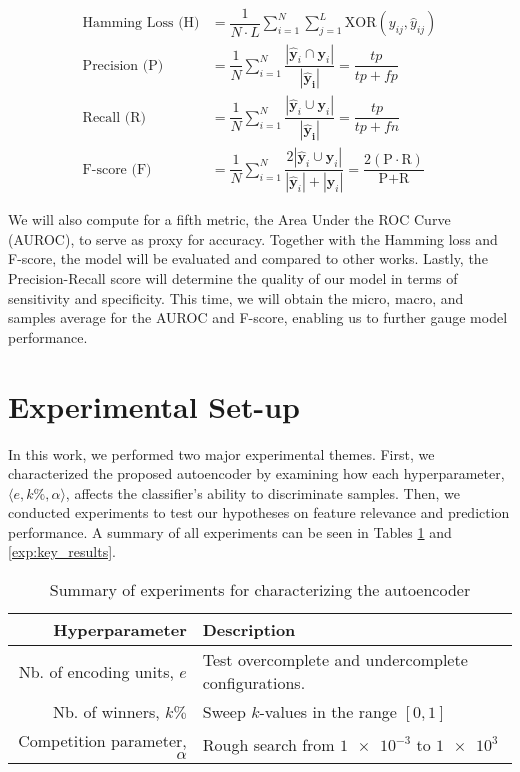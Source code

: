 \begin{align}
    \text{Hamming Loss (H)} &= \dfrac{1}{N \cdot L} \sum_{i=1}^{N} \sum_{j=1}^{L}
    \text{XOR}(y_{ij}, \widehat{y}_{ij}) \\
    \text{Precision (P)} &=
    \dfrac{1}{N}\sum_{i=1}^{N}\dfrac{|\mathbf{\widehat{y}}_{i} \cap
    \mathbf{y}_{i}|}{|\mathbf{\widehat{y}_{i}}|} = \dfrac{tp}{tp + fp} \\
    \text{Recall (R)} &=
    \dfrac{1}{N}\sum_{i=1}^{N}\dfrac{|\mathbf{\widehat{y}}_{i} \cup
    \mathbf{y}_{i}|}{|\mathbf{\widehat{y}_{i}}|} = \dfrac{tp}{tp + fn} \\
    \text{F-score (F)} &=
    \dfrac{1}{N}\sum_{i=1}^{N} \dfrac{2 | \mathbf{\widehat{y}}_{i} \cup
        \mathbf{y}_{i}|}{|\mathbf{\widehat{y}}_{i} | + |\mathbf{y}_{i}|} =
        \dfrac{2 (\text{P} \cdot \text{R})}{\text{P} +
        \text{R}}
\end{align}

\par We will also compute for a fifth metric, the Area Under the ROC Curve
(AUROC), to serve as proxy for accuracy. Together with the Hamming loss and
F-score, the model will be evaluated and compared to other works. Lastly, the
Precision-Recall score will determine the quality of our model in terms of
sensitivity and specificity. This time, we will obtain the micro, macro, and
samples average for the AUROC and F-score, enabling us to further gauge model
performance.

\section{Experimental Set-up}
\label{MCExperiments}

In this work, we performed two major experimental themes. First, we
characterized the proposed autoencoder by examining how each hyperparameter,
$\langle e, k\%, \alpha \rangle$, affects the classifier's ability to
discriminate samples. Then, we conducted experiments to test our hypotheses
on feature relevance and prediction performance. A summary of all experiments
can be seen in Tables \ref{exp:hyperparameter} and \ref{exp:key_results}.

\begin{table}[h]
  \centering
  \caption{Summary of experiments for characterizing the autoencoder}
  \label{exp:hyperparameter}
      \begin{tabular}{@{}rp{}@{}}
          \toprule
          Hyperparameter                      & Description \\ \midrule
          Nb. of encoding units, $e$    & Test overcomplete and undercomplete configurations.\\
          Nb. of winners, $k\%$     & Sweep $k$-values in the range $\left[ 0,1\right]$\\
          Competition parameter, $\alpha$ & Rough search from $\num{1e-3}$ to $\num{1e3}$\\ \bottomrule
      \end{tabular}
\end{table}

